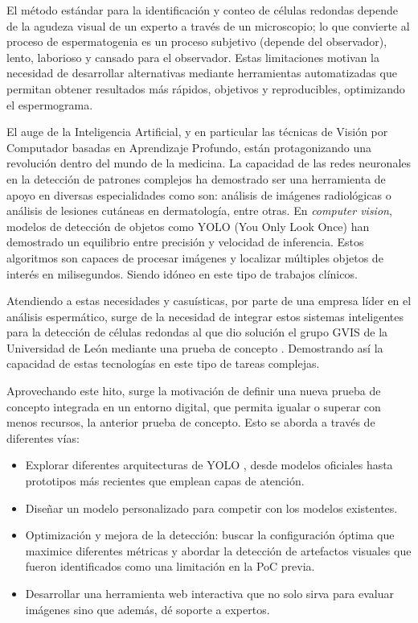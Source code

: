 \documentclass[12pt,a4paper,onecolumn,oneside]{report}
\begin{document}
El método estándar para la identificación y conteo de células redondas depende de la agudeza visual de un experto a través de un microscopio; lo que convierte al proceso de
espermatogenia es un proceso subjetivo (depende del observador), lento, laborioso y cansado para el observador. Estas limitaciones motivan la necesidad 
de desarrollar alternativas mediante herramientas automatizadas que permitan obtener resultados más rápidos, objetivos y reproducibles, optimizando el espermograma.

El auge de la Inteligencia Artificial, y en particular las técnicas de Visión por Computador basadas en Aprendizaje Profundo, están protagonizando una revolución dentro del mundo de la medicina.
La capacidad de las redes neuronales en la detección de patrones complejos ha demostrado ser una herramienta de apoyo en diversas especialidades como son: análisis de imágenes radiológicas o análisis de lesiones cutáneas en dermatología, entre otras.
En \textit{computer vision}, modelos de detección de objetos como YOLO (You Only Look Once) \cite{ultralytics_models} han demostrado un equilibrio entre precisión y velocidad de inferencia. Estos algoritmos son capaces de procesar imágenes y localizar múltiples objetos de interés en milisegundos.
Siendo idóneo en este tipo de trabajos clínicos.

Atendiendo a estas necesidades y casuísticas, por parte de una empresa líder en el análisis espermático, surge de la necesidad de integrar estos sistemas inteligentes para la detección de células redondas al que dio solución el grupo GVIS de la 
Universidad de León mediante una prueba de concepto \cite{HamiltonThorneRoundCells}. Demostrando así la capacidad de estas tecnologías en este tipo de tareas complejas.

Aprovechando este hito, surge la motivación de definir una nueva prueba de concepto integrada en un entorno digital, que permita igualar o superar con menos recursos, la anterior prueba de concepto. Esto se aborda a través de diferentes vías:

\begin{itemize}
  \item Explorar diferentes arquitecturas de YOLO \cite{ultralytics_models}, desde modelos oficiales hasta prototipos más recientes que emplean capas de atención. 
  \item Diseñar un modelo personalizado para competir con los modelos existentes.
  \item Optimización y mejora de la detección: buscar la configuración óptima que maximice diferentes métricas y abordar la detección de artefactos visuales que fueron identificados como una limitación en la PoC previa. 
  \item Desarrollar una herramienta web interactiva que no solo sirva para evaluar imágenes sino que además, dé soporte a expertos.
\end{itemize}
\end{document}
